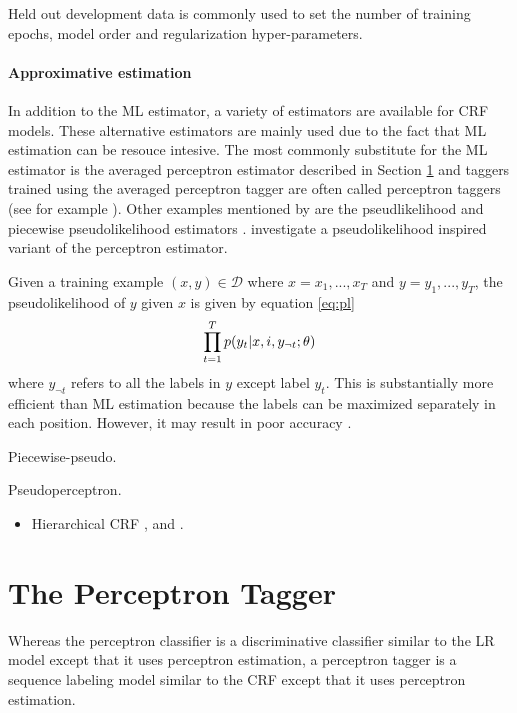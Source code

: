 Held out development data is commonly used to set the number of
training epochs, model order and regularization hyper-parameters.

\paragraph{Approximative estimation} In addition to the ML estimator,
a variety of estimators are available for CRF models. These
alternative estimators are mainly used due to the fact that ML
estimation can be resouce intesive. The most commonly substitute for
the ML estimator is the averaged perceptron estimator described in
Section \ref{sec:prec-tagger} and taggers trained using the averaged
perceptron tagger are often called perceptron taggers (see for example
\cite{Collins2002}). Other examples mentioned by \cite{Sutton2012} are
the pseudlikelihood \cite{Besag1975} and piecewise pseudolikelihood estimators
\cite{Sutton2007}. \cite{Ruokolainen2014} investigate a
pseudolikelihood inspired variant of the perceptron estimator.

Given a training example $(x,y) \in \mathcal{D}$ where $x = x_1, ..., x_T$ and $y = y_1, ..., y_T$, the pseudolikelihood of $y$ given $x$ is given by equation \ref{eq:pl}
\begin{equation}\label{pl}\prod_{t = 1}^T p(y_t | x, i, y_{\neg t} \mbox{$ ; \, $} \theta)\end{equation}
where $y_{\neg t}$ refers to all the labels in $y$ except label
$y_t$. This is substantially more efficient than ML estimation because
the labels can be maximized separately in each position. However, it
may result in poor accuracy \citep{someone}.

Piecewise-pseudo.

Pseudoperceptron.

\begin{itemize}
\item Hierarchical CRF \cite{Muller2013}, \cite{Weiss2010} and \cite{Charniak2005}.
\end{itemize}

\section{The Perceptron Tagger}
\label{sec:prec-tagger}

Whereas the perceptron classifier is a discriminative classifier
similar to the LR model except that it uses perceptron estimation, a
perceptron tagger \citep{Collins2002} is a sequence labeling model
similar to the CRF except that it uses perceptron estimation.

